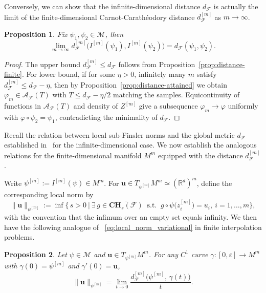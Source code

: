 \documentclass[12pt]{amsart}
\numberwithin{equation}{section}
\newtheorem{proposition}{Proposition}[section]
\theoremstyle{remark}
\begin{document}
Conversely, we can show that the infinite-dimensional distance $d_{\mathcal F}$ is actually
the limit of the finite-dimensional Carnot-Carathéodory distance $d_{\mathcal F}^{[m]}$ as $m\to\infty$.

\begin{proposition}
\label{prop:discrete_to_continuous_distance}
Fix $\psi_1,\psi_2\in \mathcal M$, then
\begin{equation}
\lim_{m\to\infty} d_{\mathcal F}^{[m]}\!\big(I^{[m]}(\psi_1),I^{[m]}(\psi_2)\big)= d_{\mathcal F}(\psi_1,\psi_2).
\end{equation}
\end{proposition}

\begin{proof}
The upper bound $d_{\mathcal F}^{[m]}\le d_{\mathcal F}$ follows from Proposition~\ref{prop:distance-finite}.
For lower bound, if for some $\eta>0$,
infinitely many $m$ satisfy $d_{\mathcal F}^{[m]}\le d_{\mathcal F}-\eta$,
then by Proposition~\ref{prop:distance-attained} we obtain $\varphi_m\in \mathcal A_{\mathcal F}(T)$ with $ T\le d_{\mathcal F}-\eta/2$ matching the samples. Equicontinuity of functions in $\mathcal A_{\mathcal F}(T)$ and density of $Z^{[m]}$ give a subsequence $\varphi_m\to \varphi$ uniformly with $\varphi\circ\psi_2=\psi_1$, contradicting the minimality of $d_{\mathcal F}$.
\end{proof}

Recall
the relation between local sub-Finsler norms and the global metric $d_{\mathcal F}$ established in~ for the infinite-dimensional case.
We now establish the analogous relations for the finite-dimensional manifold \(M^m\) equipped with the distance
\(d_{\mathcal F}^{[m]}\).

Write \(\psi^{[m]}:=I^{[m]}(\psi)\in M^m\).
For \(\mathbf u\in T_{\psi^{[m]}}M^m\simeq (\mathbb R^d)^m\), define the corresponding local norm by
\begin{equation}
\label{eq:discrete_local_norm_variational}
\|\mathbf u\|_{\psi^{[m]}}
:=\inf\Big\{\, s>0\ \Big|\ \exists\, g\in \overline{\mathbf{CH}_s(\mathcal F)}\ \text{ s.t. }\ g\circ\psi\big(z^{[m]}_i\big)=u_i,\ i=1,\dots,m\Big\},
\end{equation}
with the convention that the infimum over an empty set equals infinity.
We then have the following analogue of ~\eqref{eq:local_norm_variational} in finite interpolation problems.

\begin{proposition}
\label{prop:discrete_local_derivative}
Let \(\psi\in\mathcal M\) and \(\mathbf u\in T_{\psi^{[m]}}M^m\).
For any \(C^1\) curve \(\gamma:[0,\varepsilon]\to M^m\) with \(\gamma(0)=\psi^{[m]}\) and \(\gamma'(0)=\mathbf u\),
\begin{equation}
\label{eq:discrete_local_norm_derivative}
\|\mathbf u\|_{\psi^{[m]}}
=\lim_{t\to 0}\frac{d_{\mathcal F}^{[m]}\!\big(\psi^{[m]},\, \gamma(t)\big)}{t}.
\end{equation}
\end{proposition}
\end{document}
